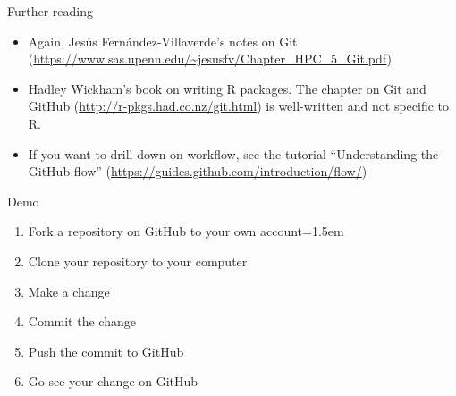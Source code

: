 \documentclass{beamer}
\begin{document}
\begin{frame}{Further reading}
\begin{itemize}
\item Again, Jes\'us Fern\'andez-Villaverde's notes on Git (\url{https://www.sas.upenn.edu/~jesusfv/Chapter_HPC_5_Git.pdf})
\item Hadley Wickham's book on writing R packages. The chapter on Git and GitHub (\url{http://r-pkgs.had.co.nz/git.html}) is well-written and not specific to R.
\item If you want to drill down on workflow, see the tutorial ``Understanding the GitHub flow'' (\url{https://guides.github.com/introduction/flow/})
\end{itemize}
\end{frame}

\begin{frame}{Demo}
\begin{enumerate}
\item Fork a repository on GitHub to your own account\itemsep=1.5em
\item Clone your repository to your computer
\item Make a change
\item Commit the change
\item Push the commit to GitHub
\item Go see your change on GitHub
\end{enumerate}
\end{frame}
\end{document}
